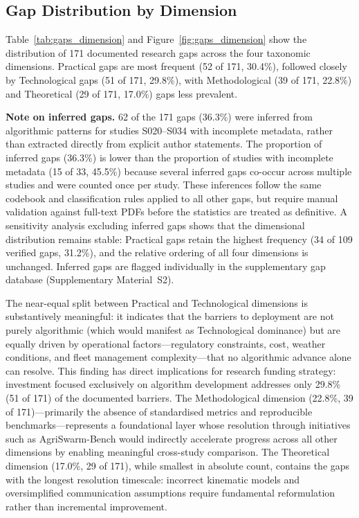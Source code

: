 \documentclass[review,3p,times]{elsarticle}
\begin{document}
\subsection{Gap Distribution by Dimension}

Table~\ref{tab:gaps_dimension} and Figure~\ref{fig:gaps_dimension} show the distribution of 171 documented research gaps across the four taxonomic dimensions. Practical gaps are most frequent (52 of 171, 30.4\%), followed closely by Technological gaps (51 of 171, 29.8\%), with Methodological (39 of 171, 22.8\%) and Theoretical (29 of 171, 17.0\%) gaps less prevalent.

\textbf{Note on inferred gaps.} 62 of the 171 gaps (36.3\%) were inferred from algorithmic patterns for studies S020--S034 with incomplete metadata, rather than extracted directly from explicit author statements. The proportion of inferred gaps (36.3\%) is lower than the proportion of studies with incomplete metadata (15 of 33, 45.5\%) because several inferred gaps co-occur across multiple studies and were counted once per study. These inferences follow the same codebook and classification rules applied to all other gaps, but require manual validation against full-text PDFs before the statistics are treated as definitive. A sensitivity analysis excluding inferred gaps shows that the dimensional distribution remains stable: Practical gaps retain the highest frequency (34 of 109 verified gaps, 31.2\%), and the relative ordering of all four dimensions is unchanged. Inferred gaps are flagged individually in the supplementary gap database (Supplementary Material~S2).

The near-equal split between Practical and Technological dimensions is substantively meaningful: it indicates that the barriers to deployment are not purely algorithmic (which would manifest as Technological dominance) but are equally driven by operational factors---regulatory constraints, cost, weather conditions, and fleet management complexity---that no algorithmic advance alone can resolve. This finding has direct implications for research funding strategy: investment focused exclusively on algorithm development addresses only 29.8\% (51 of 171) of the documented barriers. The Methodological dimension (22.8\%, 39 of 171)---primarily the absence of standardised metrics and reproducible benchmarks---represents a foundational layer whose resolution through initiatives such as AgriSwarm-Bench would indirectly accelerate progress across all other dimensions by enabling meaningful cross-study comparison. The Theoretical dimension (17.0\%, 29 of 171), while smallest in absolute count, contains the gaps with the longest resolution timescale: incorrect kinematic models and oversimplified communication assumptions require fundamental reformulation rather than incremental improvement.
\end{document}
